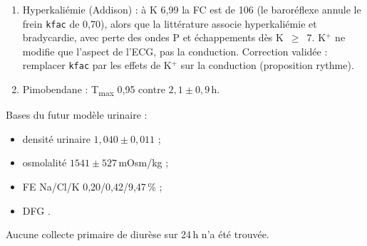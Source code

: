 \documentclass[11pt,a4paper]{article}
\newcommand{\ecart}[1]{\textcolor{red!60!black}{#1}}
\begin{document}
\begin{enumerate}
\begin{itemize}
    \item HCO$_3^-<22$ seulement à partir du stade~3, contre 43/67/78/76\,\% des chiens aux stades~1 à 4 \citep{lippi2023} ;
    \item phosphate dans l'étendue publiée \citep{parker2017,cortadellas2010} ;
    \item hématocrite trop haute de 4 à 5 points \citep{lippi2021} ;
    \item calcium non modélisé.
  \end{itemize}
  \item \ecart{Hyperkaliémie (Addison)} : à K 6,99 la FC est de 106 (le baroréflexe annule le frein \texttt{kfac} de 0,70), alors que la littérature associe hyperkaliémie et bradycardie, avec perte des ondes P et échappements dès K~$\geq$~7. K$^+$ ne modifie que l'aspect de l'ECG, pas la conduction. Correction validée : remplacer \texttt{kfac} par les effets de K$^+$ sur la conduction (proposition rythme).
  \item \ecart{Pimobendane} : T\textsubscript{max} 0,95 contre $2{,}1\pm0{,}9$\,h.
\end{enumerate}

Bases du futur modèle urinaire :
\begin{itemize}
  \item densité urinaire $1{,}040\pm0{,}011$ \citep{rudinsky2019} ;
  \item osmolalité $1541\pm527$\,mOsm/kg \citep{vanvonderen1997} ;
  \item FE Na/Cl/K 0,20/0,42/9,47\,\% \citep{troia2018} ;
  \item DFG \citep{bexfield2008,kelley2022,kelly2016}.
\end{itemize}
Aucune collecte primaire de diurèse sur 24\,h n'a été trouvée.
\end{document}
